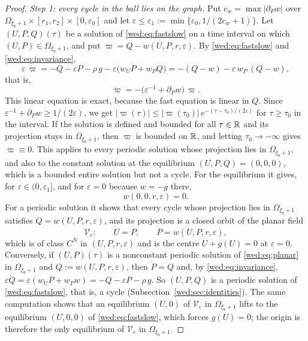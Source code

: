 \begin{proof}
\emph{Step 1: every cycle in the ball lies on the graph.} Put $c_w=\max|\partial_Pw|$ over $\Omega_{\xi_b+1}\times[r_1,r_2]\times[0,\varepsilon_0]$ and let $\varepsilon\le\varepsilon_1:=\min\{\varepsilon_0,1/(2c_w+1)\}$. Let $(U,P,Q)(\tau)$ be a solution of \eqref{wed:eq:fastslow} on a time interval on which $(U,P)\in\Omega_{\xi_b+1}$, and put $\varpi=Q-w(U,P,r,\varepsilon)$. By \eqref{wed:eq:fastslow} and \eqref{wed:eq:invariance},
\[
\varepsilon\,\dot\varpi=-Q-\varepsilon P-\rho\,g-\varepsilon\bigl(w_UP+w_PQ\bigr)=-(Q-w)-\varepsilon\,w_P\,(Q-w),
\]
that is,
\begin{equation}\label{wed:eq:varpi}
\dot\varpi=-\bigl(\varepsilon^{-1}+\partial_Pw\bigr)\,\varpi .
\end{equation}
This linear equation is exact, because the fast equation is linear in $Q$. Since $\varepsilon^{-1}+\partial_Pw\ge1/(2\varepsilon)$, we get $|\varpi(\tau)|\le|\varpi(\tau_0)|\,e^{-(\tau-\tau_0)/(2\varepsilon)}$ for $\tau\ge\tau_0$ in the interval. If the solution is defined and bounded for all $\tau\in\mathbb R$ and its projection stays in $\Omega_{\xi_b+1}$, then $\varpi$ is bounded on $\mathbb R$, and letting $\tau_0\to-\infty$ gives $\varpi\equiv0$. This applies to every periodic solution whose projection lies in $\Omega_{\xi_b+1}$, and also to the constant solution at the equilibrium $(U,P,Q)=(0,0,0)$, which is a bounded entire solution but not a cycle. For the equilibrium it gives, for $\varepsilon\in(0,\varepsilon_1]$, and for $\varepsilon=0$ because $w=-g$ there,
\begin{equation}\label{wed:eq:wzero}
w(0,0,r,\varepsilon)=0 .
\end{equation}
For a periodic solution it shows that every cycle whose projection lies in $\Omega_{\xi_b+1}$ satisfies $Q=w(U,P,r,\varepsilon)$, and its projection is a closed orbit of the planar field
\begin{equation}\label{wed:eq:planar}
\mathcal V_\varepsilon:\qquad \dot U=P,\qquad \dot P=w(U,P,r,\varepsilon),
\end{equation}
which is of class $C^N$ in $(U,P,r,\varepsilon)$ and is the centre $\ddot U+g(U)=0$ at $\varepsilon=0$. Conversely, if $(U,P)(\tau)$ is a nonconstant periodic solution of \eqref{wed:eq:planar} in $\Omega_{\xi_b+1}$ and $Q:=w(U,P,r,\varepsilon)$, then $\dot P=Q$ and, by \eqref{wed:eq:invariance}, $\varepsilon\dot Q=\varepsilon(w_UP+w_Pw)=-Q-\varepsilon P-\rho\,g$. So $(U,P,Q)$ is a periodic solution of \eqref{wed:eq:fastslow}, that is, a cycle (Subsection~\ref{wed:sec:identities}). The same computation shows that an equilibrium $(U,0)$ of $\mathcal V_\varepsilon$ in $\Omega_{\xi_b+1}$ lifts to the equilibrium $(U,0,0)$ of \eqref{wed:eq:fastslow}, which forces $g(U)=0$; the origin is therefore the only equilibrium of $\mathcal V_\varepsilon$ in $\Omega_{\xi_b+1}$.


\end{proof}
